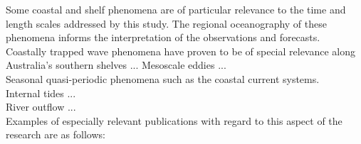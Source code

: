 Some coastal and shelf phenomena are of particular relevance to the time and length scales addressed by this study.  The regional oceanography of these phenomena informs the interpretation of the observations and forecasts.\\
Coastally trapped wave phenomena have proven to be of special relevance along Australia's southern shelves ...
Mesoscale eddies ...\\
Seasonal quasi-periodic phenomena such as the coastal current systems.\\
Internal tides ...\\
River outflow ...\\

Examples of especially relevant publications with regard to this aspect of the research are as follows:\\
\citep{Fu:2001ub}\\
\citep{leBlond:2009tl}\\
\citep{Brink:1991dl}\\





